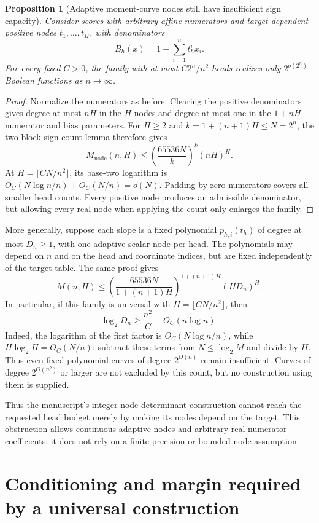 \documentclass[11pt]{article}
\newtheorem{proposition}{Proposition}
\begin{document}
\begin{proposition}[Adaptive moment-curve nodes still have insufficient sign capacity]
Consider scores with arbitrary affine numerators and target-dependent positive
nodes $t_1,\ldots,t_H$, with denominators
\[
 B_h(x)=1+\sum_{i=1}^n t_h^i x_i.
\]
For every fixed $C>0$, the family with at most $C2^n/n^2$ heads realizes
only $2^{o(2^n)}$ Boolean functions as $n\to\infty$.
\end{proposition}
\begin{proof}
Normalize the numerators as before. Clearing the positive denominators
gives degree at most $nH$ in the $H$ nodes and degree at most one in
the $1+nH$ numerator and bias parameters. For $H\ge2$ and
$k=1+(n+1)H\le N=2^n$, the two-block sign-count lemma therefore gives
\[
 M_{\mathrm{node}}(n,H)
 \le\left(\frac{65536N}{k}\right)^k(nH)^H.
\]
At $H=\lfloor CN/n^2\rfloor$, its base-two logarithm is
$O_C(N\log n/n)+O_C(N/n)=o(N)$. Padding by zero numerators covers
all smaller head counts. Every positive node produces an admissible
denominator, but allowing every real node when applying the count
only enlarges the family.
\end{proof}

More generally, suppose each slope is a fixed polynomial
$p_{h,i}(t_h)$ of degree at most $D_n\ge1$, with one adaptive scalar
node per head. The polynomials may depend on $n$ and on the head and
coordinate indices, but are fixed independently of the target table.
The same proof gives
\[
 M(n,H)\le
 \left(\frac{65536N}{1+(n+1)H}\right)^{1+(n+1)H}(HD_n)^H.
\]
In particular, if this family is universal with
$H=\lfloor CN/n^2\rfloor$, then
\[
 \log_2D_n\ge\frac{n^2}{C}-O_C(n\log n).
\]
Indeed, the logarithm of the first factor is
$O_C(N\log n/n)$, while $H\log_2H=O_C(N/n)$; subtract these
terms from $N\le\log_2M$ and divide by $H$.
Thus even fixed polynomial curves of degree $2^{O(n)}$ remain
insufficient. Curves of degree $2^{\Theta(n^2)}$ or larger are not
excluded by this count, but no construction using them is supplied.

Thus the manuscript's integer-node determinant construction cannot
reach the requested head budget merely by making its nodes depend on
the target. This obstruction allows continuous adaptive nodes and
arbitrary real numerator coefficients; it does not rely on a finite
precision or bounded-node assumption.

\section{Conditioning and margin required by a universal construction}
\end{document}
